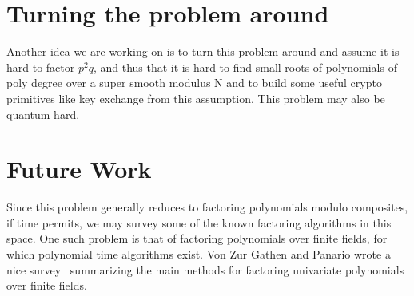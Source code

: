 \documentclass[letterpaper,twocolumn,10pt]{article}
\begin{document}
\section{Turning the problem around} 
Another idea we are working on is to turn this problem around and assume it is hard to factor $p^2q$, and thus that it is hard to find small roots of polynomials of poly degree over a super smooth modulus N and to build some useful crypto primitives like key exchange from this assumption. This problem may also be quantum hard. 

\section{Future Work}

Since this problem generally reduces to factoring polynomials modulo composites, if time permits, we may survey some of the known factoring algorithms in this space. One such problem is that of factoring polynomials over finite fields, for which polynomial time algorithms exist. Von Zur Gathen and Panario wrote a nice survey~\cite{Gathen} summarizing the main methods for factoring univariate polynomials over finite fields. 



{\footnotesize 
}


\end{document}
